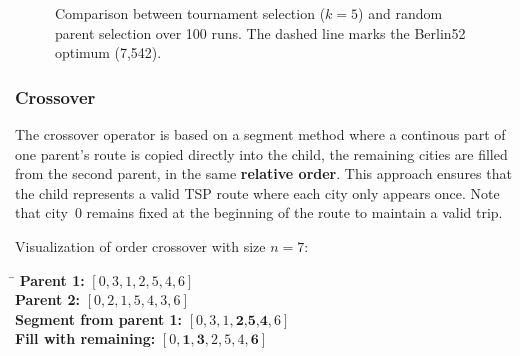 \documentclass{scrartcl}
\begin{document}
\begin{figure}[H]
  \centering
  \caption{Comparison between tournament selection ($k=5$) and random parent selection over 100 runs. The dashed line marks the Berlin52 optimum (7,542).}
  \label{fig:tournament_selection}
\end{figure}






\subsubsection{Crossover}
The crossover operator is based on a segment method where a continous part of one parent's route is copied directly into the child, the remaining cities are filled from the second parent, in the same \textbf{relative order}. This approach ensures that the child represents a valid TSP route where each city only appears once. Note that city~0 remains fixed at the beginning of the route to maintain a valid trip.

Visualization of order crossover with size $n = 7$:

\begin{center}
\begin{tabbing}
\hspace{6cm}\=\kill
\textbf{Parent 1:} \> $[0, 3, 1, 2, 5, 4, 6]$ \\
\textbf{Parent 2:} \> $[0, 2, 1, 5, 4, 3, 6]$ \\
\textbf{Segment from parent 1:} \> $[0, 3, 1, \textbf{2,5,4}, 6]$ \\
\textbf{Fill with remaining:} \> $[0, \textbf{1}, \textbf{3}, 2, 5, 4, \textbf{6}]$
\end{tabbing}
\end{center}
\end{document}
